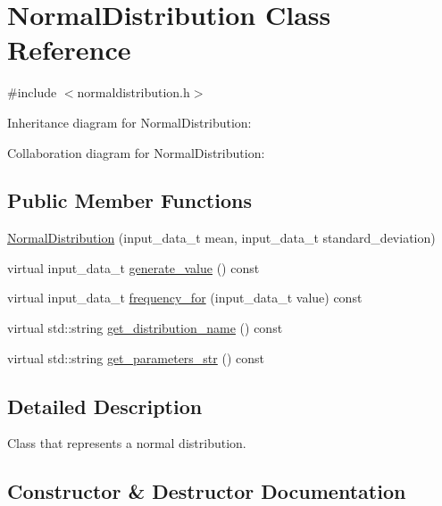 \hypertarget{classNormalDistribution}{}\section{Normal\+Distribution Class Reference}
\label{classNormalDistribution}


{\ttfamily \#include $<$normaldistribution.\+h$>$}



Inheritance diagram for Normal\+Distribution\+:


Collaboration diagram for Normal\+Distribution\+:
\subsection*{Public Member Functions}
\begin{DoxyCompactItemize}
\item 
\hyperlink{classNormalDistribution_a62230bbde6fd5134be9ec87581a505cd}{Normal\+Distribution} (input\+\_\+data\+\_\+t mean, input\+\_\+data\+\_\+t standard\+\_\+deviation)
\item 
virtual input\+\_\+data\+\_\+t \hyperlink{classNormalDistribution_a147f7de64cc0d8eb98a44a4aa1187ec2}{generate\+\_\+value} () const
\item 
virtual input\+\_\+data\+\_\+t \hyperlink{classNormalDistribution_a6041c54ace5ecc585fdef3d21386e831}{frequency\+\_\+for} (input\+\_\+data\+\_\+t value) const
\item 
virtual std\+::string \hyperlink{classNormalDistribution_a13afb9f11a9d643ff1af5de2ca066005}{get\+\_\+distribution\+\_\+name} () const
\item 
virtual std\+::string \hyperlink{classNormalDistribution_acedea04da0d96d01ed5c7fde83a56e1c}{get\+\_\+parameters\+\_\+str} () const
\end{DoxyCompactItemize}


\subsection{Detailed Description}
Class that represents a normal distribution. 

\subsection{Constructor \& Destructor Documentation}
\mbox{\label{classNormalDistribution_a62230bbde6fd5134be9ec87581a505cd}} 
